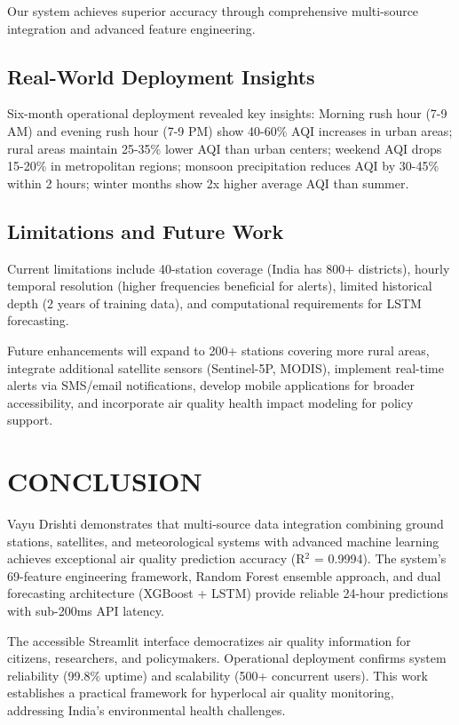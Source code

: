 \documentclass[10pt,twocolumn]{article}
\begin{document}
Our system achieves superior accuracy through comprehensive multi-source integration and advanced feature engineering.

\subsection{Real-World Deployment Insights}

Six-month operational deployment revealed key insights: Morning rush hour (7-9 AM) and evening rush hour (7-9 PM) show 40-60\% AQI increases in urban areas; rural areas maintain 25-35\% lower AQI than urban centers; weekend AQI drops 15-20\% in metropolitan regions; monsoon precipitation reduces AQI by 30-45\% within 2 hours; winter months show 2x higher average AQI than summer.

\subsection{Limitations and Future Work}

Current limitations include 40-station coverage (India has 800+ districts), hourly temporal resolution (higher frequencies beneficial for alerts), limited historical depth (2 years of training data), and computational requirements for LSTM forecasting.

Future enhancements will expand to 200+ stations covering more rural areas, integrate additional satellite sensors (Sentinel-5P, MODIS), implement real-time alerts via SMS/email notifications, develop mobile applications for broader accessibility, and incorporate air quality health impact modeling for policy support.

\section{CONCLUSION}

Vayu Drishti demonstrates that multi-source data integration combining ground stations, satellites, and meteorological systems with advanced machine learning achieves exceptional air quality prediction accuracy (R$^2$ = 0.9994). The system's 69-feature engineering framework, Random Forest ensemble approach, and dual forecasting architecture (XGBoost + LSTM) provide reliable 24-hour predictions with sub-200ms API latency.

The accessible Streamlit interface democratizes air quality information for citizens, researchers, and policymakers. Operational deployment confirms system reliability (99.8\% uptime) and scalability (500+ concurrent users). This work establishes a practical framework for hyperlocal air quality monitoring, addressing India's environmental health challenges.
\end{document}
